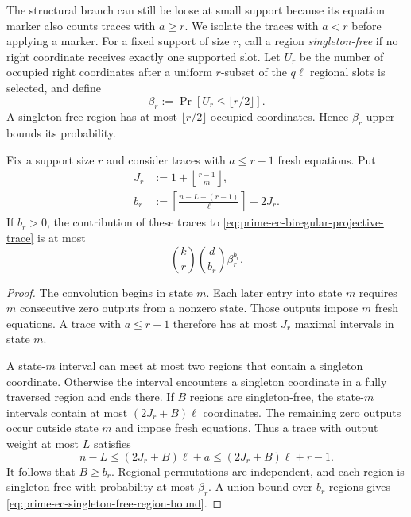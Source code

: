 The structural branch can still be loose at small support because its
equation marker also counts traces with $a\geq r$.  We isolate the traces
with $a<r$ before applying a marker.  For a fixed support of size $r$, call a
region \emph{singleton-free} if no right coordinate receives exactly one
supported slot.  Let $U_r$ be the number of occupied right coordinates after
a uniform $r$-subset of the $q\ell$ regional slots is selected, and define
\begin{equation}
 \beta_r:=\Pr[U_r\leq\lfloor r/2\rfloor].
 \label{eq:prime-ec-singleton-free-probability}
\end{equation}
A singleton-free region has at most $\lfloor r/2\rfloor$ occupied
coordinates.  Hence $\beta_r$ upper-bounds its probability.

\begin{lemma}
\label{lem:prime-ec-singleton-free-regions}
Fix a support size $r$ and consider traces with $a\leq r-1$ fresh equations.
Put
\begin{align}
 J_r&:=1+\left\lfloor\frac{r-1}{m}\right\rfloor,\\
 b_r&:=\left\lceil\frac{n-L-(r-1)}{\ell}\right\rceil-2J_r.
 \label{eq:prime-ec-required-singleton-free-regions}
\end{align}
If $b_r>0$, the contribution of these traces to
\eqref{eq:prime-ec-biregular-projective-trace} is at most
\begin{equation}
 \binom{k}{r}\binom{d}{b_r}\beta_r^{b_r}.
 \label{eq:prime-ec-singleton-free-region-bound}
\end{equation}
\end{lemma}

\begin{proof}
The convolution begins in state $m$.  Each later entry into state $m$
requires $m$ consecutive zero outputs from a nonzero state.  Those outputs
impose $m$ fresh equations.  A trace with $a\leq r-1$ therefore has at most
$J_r$ maximal intervals in state $m$.

A state-$m$ interval can meet at most two regions that contain a singleton
coordinate.  Otherwise the interval encounters a singleton coordinate in a
fully traversed region and ends there.  If $B$ regions are singleton-free,
the state-$m$ intervals contain at most $(2J_r+B)\ell$ coordinates.  The
remaining zero outputs occur outside state $m$ and impose fresh equations.
Thus a trace with output weight at most $L$ satisfies
\[
 n-L\leq (2J_r+B)\ell+a
       \leq (2J_r+B)\ell+r-1.
\]
It follows that $B\geq b_r$.  Regional permutations are independent, and
each region is singleton-free with probability at most $\beta_r$.  A union
bound over $b_r$ regions gives
\eqref{eq:prime-ec-singleton-free-region-bound}.
\end{proof}

